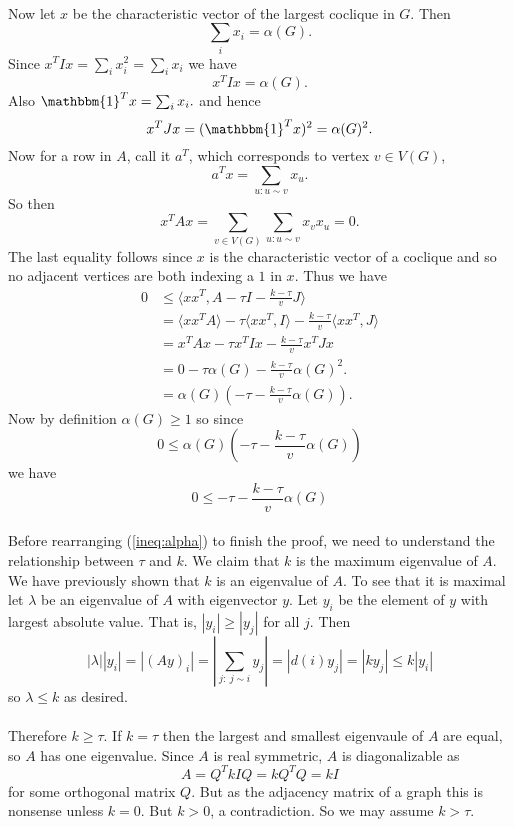 \documentclass[letterpaper,12pt,oneside,onecolumn]{article}
\newcommand{\1}{\mathbbm{1}}
\begin{document}
\paragraph{}
Now let $x$ be the characteristic vector of the largest coclique in $G$. Then 
$$\sum_{i} x_i = \alpha(G).$$
Since $x^TIx = \sum_{i} x_i^2 = \sum_{i} x_i$ we have
$$x^TIx = \alpha(G).$$
Also $\1^Tx = \sum_{i} x_i.$ and hence
$$x^TJx = (\1^Tx)^2 = \alpha(G)^2.$$
Now for a row in $A$, call it $a^T$, which corresponds to vertex $v \in V(G)$,
$$a^Tx = \sum_{u: u\sim v} x_u.$$
So then
$$x^T A x = \sum_{v \in V(G)} \sum_{u:u\sim v} x_v x_u = 0.$$
The last equality follows since $x$ is the characteristic vector of a coclique and so no adjacent vertices are both indexing a $1$ in $x$.
Thus we have
\begin{align*}
0 &\leq \langle xx^T, A - \tau I - \frac{k - \tau}{v} J \rangle \\
&= \langle xx^TA\rangle - \tau \langle xx^T, I \rangle - \frac{k - \tau}{v} \langle xx^T, J \rangle \\
&= x^TAx - \tau x^TIx -\frac{k - \tau}{v} x^TJ x \\
&= 0 - \tau \alpha(G) - \frac{k -\tau}{v} \alpha (G)^2. \\
&= \alpha(G)(-\tau - \frac{k-\tau}{v} \alpha(G)).
\end{align*}
Now by definition $\alpha(G) \geq 1$ so since 
$$ 0 \leq \alpha(G)(-\tau - \frac{k-\tau}{v} \alpha(G))$$
we have
\begin{equation}
0 \leq -\tau - \frac{k-\tau}{v} \alpha(G) \label{ineq:alpha}\end{equation}
\paragraph{}
Before rearranging (\ref{ineq:alpha}) to finish the proof, we need to understand the relationship between $\tau$ and $k$. We claim that $k$ is the maximum eigenvalue of $A$. We have previously shown that $k$ is an eigenvalue of $A$. To see that it is maximal let $\lambda$ be an eigenvalue of $A$ with eigenvector $y$. Let $y_i$ be the element of $y$ with largest absolute value. That is, $|y_i| \geq |y_j|$ for all $j$. Then
$$ |\lambda| |y_i| = |(Ay)_i| = |\sum_{j:\ j \sim i} y_j| = |d(i) y_j| = |k y_j| \leq k|y_i|$$
so $\lambda \leq k$ as desired.
\paragraph{}
Therefore $k \geq \tau$. If $k = \tau$ then the largest and smallest eigenvaule of $A$ are equal, so $A$ has one eigenvalue. Since $A$ is real symmetric, $A$ is diagonalizable as
$$A = Q^T k I Q = kQ^TQ = kI$$
for some orthogonal matrix $Q$. But as the adjacency matrix of a graph this is nonsense unless $k = 0$. But $k > 0$, a contradiction. So we may assume $k > \tau$.
\end{document}
